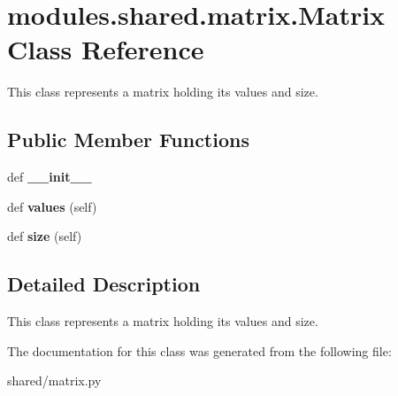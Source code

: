 \hypertarget{classmodules_1_1shared_1_1matrix_1_1_matrix}{}\section{modules.\+shared.\+matrix.\+Matrix Class Reference}
\label{classmodules_1_1shared_1_1matrix_1_1_matrix}


This class represents a matrix holding its values and size.  


\subsection*{Public Member Functions}
\begin{DoxyCompactItemize}
\item 
\mbox{\label{classmodules_1_1shared_1_1matrix_1_1_matrix_a32926b695d2ea22c15fba2cd4aa6cfb6}} 
def {\bfseries \+\_\+\+\_\+init\+\_\+\+\_\+}
\item 
\mbox{\label{classmodules_1_1shared_1_1matrix_1_1_matrix_a703cf34dc79b4f0b94a8f8cf3fdf8b89}} 
def {\bfseries values} (self)
\item 
\mbox{\label{classmodules_1_1shared_1_1matrix_1_1_matrix_adca7e7e53fc7eaa5cb8d8273915ec4d6}} 
def {\bfseries size} (self)
\end{DoxyCompactItemize}


\subsection{Detailed Description}
This class represents a matrix holding its values and size. 

The documentation for this class was generated from the following file\+:\begin{DoxyCompactItemize}
\item 
shared/matrix.\+py\end{DoxyCompactItemize}
